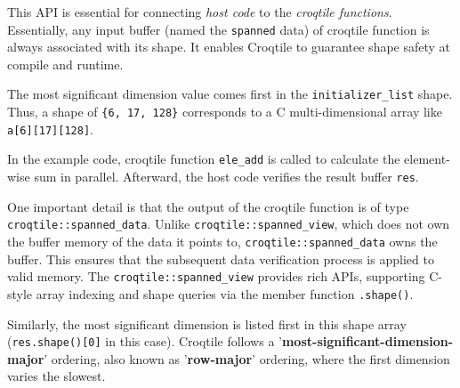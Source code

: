This API is essential for connecting \emph{host code} to the \emph{croqtile functions}. Essentially, any input buffer (named the \texttt{spanned} data) of croqtile function is always associated with its shape. It enables Croqtile to guarantee shape safety at compile and runtime.

\begin{keypoint}[Note]
The most significant dimension value comes first in the \texttt{initializer\_\allowbreak{}list} shape. Thus, a shape of \texttt{\{6, 17, 128\}} corresponds to a C multi-dimensional array like \texttt{a[6][17][128]}.
\end{keypoint}

In the example code, croqtile function \texttt{ele\_add} is called to calculate the element-wise sum in parallel. Afterward, the host code verifies the result buffer \texttt{res}.

One important detail is that the output of the croqtile function is of type \texttt{croqtile:\allowbreak{}:\allowbreak{}spanned\_\allowbreak{}data}. Unlike \texttt{croqtile:\allowbreak{}:\allowbreak{}spanned\_\allowbreak{}view}, which does not own the buffer memory of the data it points to, \texttt{croqtile:\allowbreak{}:\allowbreak{}spanned\_\allowbreak{}data} owns the buffer. This ensures that the subsequent data verification process is applied to valid memory. The \texttt{croqtile:\allowbreak{}:\allowbreak{}spanned\_\allowbreak{}view} provides rich APIs, supporting C-style array indexing and shape queries via the member function \texttt{.shape()}.

Similarly, the most significant dimension is listed first in this shape array (\texttt{res.shape()[0]} in this case). Croqtile follows a '\textbf{most-significant-dimension-major}' ordering, also known as '\textbf{row-major}' ordering, where the first dimension varies the slowest.
